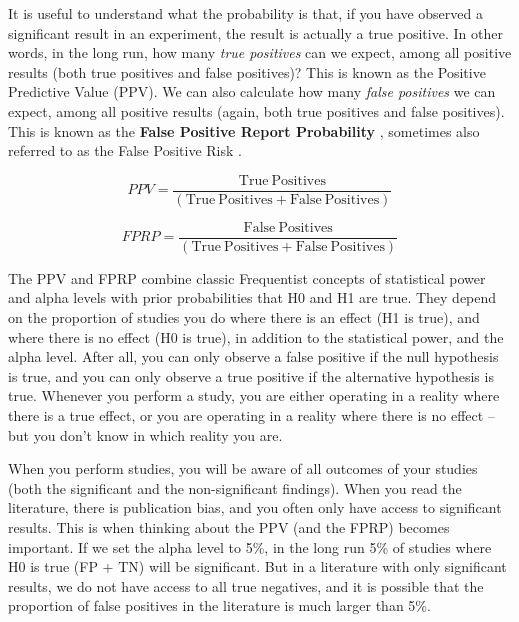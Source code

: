 \documentclass[
]{krantz}
\begin{document}
It is useful to understand what the probability is that, if you have observed a significant result in an experiment, the result is actually a true positive. In other words, in the long run, how many \emph{true positives} can we expect, among all positive results (both true positives and false positives)? This is known as the Positive Predictive Value (PPV). We can also calculate how many \emph{false positives} we can expect, among all positive results (again, both true positives and false positives). This is known as the \textbf{False Positive Report Probability} \citep{wacholder_assessing_2004}, sometimes also referred to as the False Positive Risk \citep{colquhoun_false_2019}.

\[PPV = \frac{\text{True}\ \text{Positives}}{(\text{True}\ \text{Positives} +
                                                \text{False}\ \text{Positives})}\]

\[FPRP = \frac{\text{False}\ \text{Positives}}{(\text{True}\ \text{Positives}
                                                  + \text{False}\ \text{Positives})}\]

The PPV and FPRP combine classic Frequentist concepts of statistical power and alpha levels with prior probabilities that H0 and H1 are true. They depend on the proportion of studies you do where there is an effect (H1 is true), and where there is no effect (H0 is true), in addition to the statistical power, and the alpha level. After all, you can only observe a false positive if the null hypothesis is true, and you can only observe a true positive if the alternative hypothesis is true. Whenever you perform a study, you are either operating in a reality where there is a true effect, or you are operating in a reality where there is no effect -- but you don't know in which reality you are.

When you perform studies, you will be aware of all outcomes of your studies (both the significant and the non-significant findings). When you read the literature, there is publication bias, and you often only have access to significant results. This is when thinking about the PPV (and the FPRP) becomes important. If we set the alpha level to 5\%, in the long run 5\% of studies where H0 is true (FP + TN) will be significant. But in a literature with only significant results, we do not have access to all true negatives, and it is
possible that the proportion of false positives in the literature is much larger than 5\%.
\end{document}

